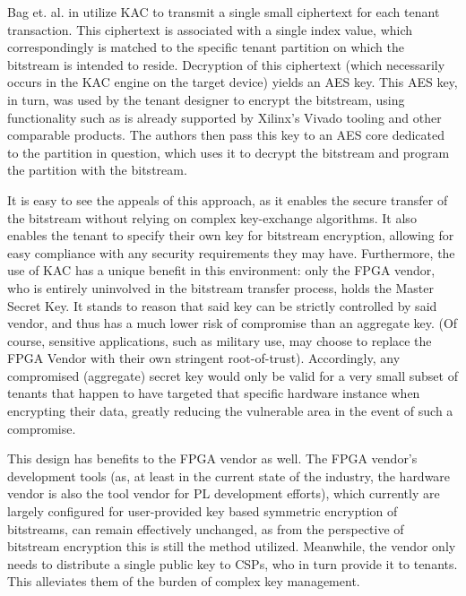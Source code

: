 Bag et. al. in \cite{bag_cryptographically_2020} utilize KAC to transmit a single small ciphertext for each tenant transaction. This ciphertext is associated with a single index value, which correspondingly is matched to the specific tenant partition on which the bitstream is intended to reside. Decryption of this ciphertext (which necessarily occurs in the KAC engine on the target device) yields an AES key. This AES key, in turn, was used by the tenant designer to encrypt the bitstream, using functionality such as is already supported by Xilinx's Vivado tooling and other comparable products. The authors then pass this key to an AES core dedicated to the partition in question, which uses it to decrypt the bitstream and program the partition with the bitstream.

It is easy to see the appeals of this approach, as it enables the secure transfer of the bitstream without relying on complex key-exchange algorithms. It also enables the tenant to specify their own key for bitstream encryption, allowing for easy compliance with any security requirements they may have. Furthermore, the use of KAC has a unique benefit in this environment: only the FPGA vendor, who is entirely uninvolved in the bitstream transfer process, holds the Master Secret Key. It stands to reason that said key can be strictly controlled by said vendor, and thus has a much lower risk of compromise than an aggregate key. (Of course, sensitive applications, such as military use, may choose to replace the FPGA Vendor with their own stringent root-of-trust). Accordingly, any compromised (aggregate) secret key would only be valid for a very small subset of tenants that happen to have targeted that specific hardware instance when encrypting their data, greatly reducing the vulnerable area in the event of such a compromise. 

This design has benefits to the FPGA vendor as well. The FPGA vendor's development tools (as, at least in the current state of the industry, the hardware vendor is also the tool vendor for PL development efforts), which currently are largely configured for user-provided key based symmetric encryption of bitstreams, can remain effectively unchanged, as from the perspective of bitstream encryption this is still the method utilized. Meanwhile, the vendor only needs to distribute a single public key to CSPs, who in turn provide it to tenants. This alleviates them of the burden of complex key management.


